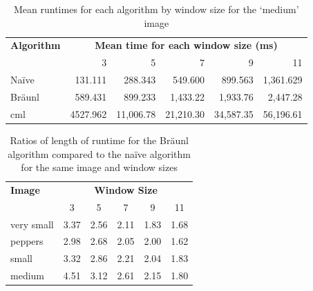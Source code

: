 \begin{table}
\centering
\caption[Mean runtimes for each algorithm for the `medium' image]{Mean runtimes for each algorithm by window size for the `medium' image}
\label{tab:median:medium}
\begin{tabular}{@{}lrrrrr@{}}
\toprule
\multicolumn{1}{c}{\textbf{Algorithm}} & \multicolumn{5}{c}{\textbf{Mean time for each window size (ms)}}      \\
\multicolumn{1}{r}{}                   & \multicolumn{1}{r}{3} & 5         & 7         & 9         & 11        \\ \midrule
Naïve                                  & 131.111               & 288.343   & 549.600   & 899.563   & 1,361.629 \\
Bräunl                                 & 589.431
               & 899.233   & 1,433.22  & 1,933.76  & 2,447.28  \\
\gls{cml}                                    & 4527.962
               & 11,006.78 & 21,210.30 & 34,587.35 & 56,196.61 \\ \bottomrule
\end{tabular}
\end{table}

\begin{table}
\centering
\caption[Ratios runtime for the Bräunl algorithm vs the naïve algorithm]{Ratios of length of runtime for the Bräunl algorithm compared to the naïve algorithm for the same image and window sizes}
\label{tab:median:ratbraun}
\begin{tabular}{@{}lccccc@{}}
\toprule
\textbf{Image} & \multicolumn{5}{c}{\textbf{Window Size}} \\
               & 3      & 5      & 7      & 9     & 11    \\ \midrule
very small     & 3.37   & 2.56   & 2.11   & 1.83  & 1.68  \\
peppers        & 2.98   & 2.68   & 2.05   & 2.00     & 1.62  \\
small          & 3.32   & 2.86   & 2.21   & 2.04  & 1.83  \\
medium         & 4.51   & 3.12   & 2.61   & 2.15  & 1.80   \\ \bottomrule
\end{tabular}
\end{table}

